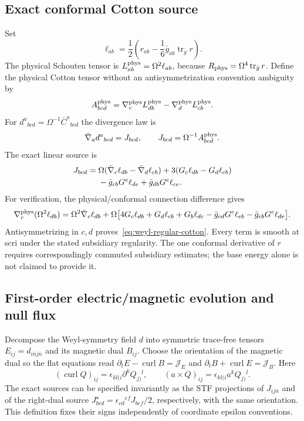 \subsection{Exact conformal Cotton source}

Set
\[
 \ell_{ab}=\frac12\left(r_{ab}
 -\frac16\bar g_{ab}\operatorname{tr}_{\bar g}r\right).
\]
The physical Schouten tensor is $L^{\rm phys}_{ab}=\Omega^2\ell_{ab}$,
because $R_{\rm phys}=\Omega^4\operatorname{tr}_{\bar g}r$.
Define the physical Cotton tensor without an antisymmetrization convention
ambiguity by
\[
 A^{\rm phys}_{bcd}=\nabla^{\rm phys}_c L^{\rm phys}_{db}
 -\nabla^{\rm phys}_dL^{\rm phys}_{cb}.
\]
For $d^a{}_{bcd}=\Omega^{-1}\bar C^a{}_{bcd}$ the divergence law is
\begin{equation}
 \bar\nabla_a d^a{}_{bcd}=J_{bcd},\qquad
 J_{bcd}=\Omega^{-1}A^{\rm phys}_{bcd}.
 \label{eq:weyl-divergence-source}
\end{equation}
The exact linear source is
\begin{align}
 J_{bcd}={}&\Omega(\bar\nabla_c\ell_{db}
 -\bar\nabla_d\ell_{cb})
 +3(G_c\ell_{db}-G_d\ell_{cb})\notag\\
 &-\bar g_{cb}G^e\ell_{de}
 +\bar g_{db}G^e\ell_{ce}.
 \label{eq:weyl-regular-cotton}
\end{align}
For verification, the physical/conformal connection difference gives
\[
 \nabla^{\rm phys}_c(\Omega^2\ell_{db})
 =\Omega^2\bar\nabla_c\ell_{db}
 +\Omega\big[4G_c\ell_{db}+G_d\ell_{cb}+G_b\ell_{dc}
 -\bar g_{cd}G^e\ell_{eb}-\bar g_{cb}G^e\ell_{de}\big].
\]
Antisymmetrizing in $c,d$ proves~\eqref{eq:weyl-regular-cotton}.
Every term is smooth at scri under the stated subsidiary regularity.
The one conformal derivative of $r$ requires correspondingly commuted
subsidiary estimates; the base energy alone is not claimed to provide it.

\subsection{First-order electric/magnetic evolution and null flux}

Decompose the Weyl-symmetry field $d$ into symmetric trace-free tensors
$E_{ij}=d_{i\bar n j\bar n}$ and its magnetic dual $B_{ij}$.
Choose the orientation of the magnetic dual so the flat equations read
$\partial_tE-\operatorname{curl}B=\mathcal J_E$ and
$\partial_tB+\operatorname{curl}E=\mathcal J_B$.
Here
\[
 (\operatorname{curl}Q)_{ij}
 =\epsilon_{kl(i}\partial^kQ_{j)}{}^l,
 \qquad
 (a\mathbin\times Q)_{ij}=\epsilon_{kl(i}a^kQ_{j)}{}^l.
\]
The exact sources can be specified invariantly as the STF projections of
$J_{i j\bar n}$ and of the right-dual source
$J^\star_{bcd}=\epsilon_{cd}{}^{ef}J_{bef}/2$, respectively, with the same
orientation.  This definition fixes their signs independently of coordinate
epsilon conventions.

